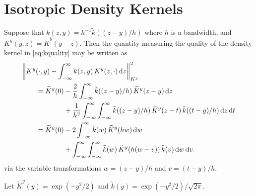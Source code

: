 \documentclass{amsart}
\newcommand{\KY}{K^y}
\newcommand{\tKY}{\widetilde{K}^y}
\newcommand{\tk}{\tilde{k}}
\begin{document}
\section{Isotropic Density Kernels}

Suppose that $k(z,y) = h^{-1}\tk((z-y)/h)$ where $h$ is a bandwidth, and $\KY(y,z) = \tKY(y-z)$.  Then the quantity measuring the quality of the density kernel in \eqref{eq:kquality} may be written as
\begin{align*}
\MoveEqLeft{\norm[\KY]{\KY(\cdot,y) - \int_{-\infty}^{\infty} k(z,y) \, \KY(z,\cdot) \, \dif z}^2} \\
&=  \tKY(0) -  \frac 2h \int_{-\infty}^{\infty} \tk((z-y)/h) \, \tKY(z-y) \, \dif z \\
& \qquad \qquad + \frac 1{h^2} \int_{-\infty}^{\infty} \int_{-\infty}^{\infty}  \tk((z-y)/h)  \, \tKY(z-t) \, \tk((t-y)/h) \, \dif z \, \dif t \\
&=   \tKY(0) - 2 \int_{-\infty}^{\infty} \tk(w) \, \tKY(hw) \, \dif w \\
& \qquad \qquad + \int_{-\infty}^{\infty} \int_{-\infty}^{\infty}  \tk(w) \, \tKY(h(w-v)) \, \tk(v)\, \dif w \, \dif v
.
\end{align*}
via the variable transformations $w = (z-y)/h$ and $v = (t-y)/h$.

Let $\tKY(y) = \exp(-y^2/2)$ and $\tk(y) = \exp(-y^2/2)/\sqrt{2\pi}$.



\end{document}
